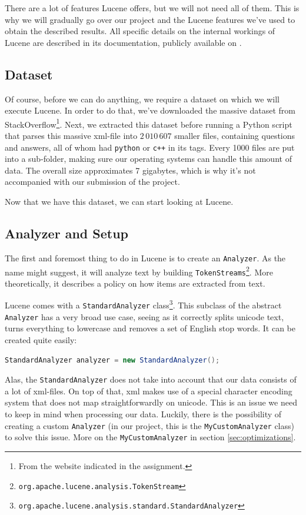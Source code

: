 \documentclass[11pt]{article}
\begin{document}
There are a lot of features Lucene offers, but we will not need all of them. This is why we will gradually go over our project and the Lucene features we've used to obtain the described results. All specific details on the internal workings of Lucene are described in its documentation, publicly available on \cite{lucene}.

\subsection{Dataset}
Of course, before we can do anything, we require a dataset on which we will execute Lucene. In order to do that, we've downloaded the massive dataset from StackOverflow\footnote{From the website indicated in the assignment.}. Next, we extracted this dataset before running a Python script that parses this massive xml-file into $2\,010\,607$ smaller files, containing questions and answers, all of whom had \texttt{python} or \texttt{c++} in its tags. Every 1000 files are put into a sub-folder, making sure our operating systems can handle this amount of data. The overall size approximates 7 gigabytes, which is why it's not accompanied with our submission of the project.

Now that we have this dataset, we can start looking at Lucene.

\subsection{Analyzer and Setup}\label{sec:analysetup}
The first and foremost thing to do in Lucene is to create an \texttt{Analyzer}. As the name might suggest, it will analyze text by building \texttt{TokenStreams}\footnote{\texttt{org.apache.lucene.analysis.TokenStream}}. More theoretically, it describes a policy on how items are extracted from text.

Lucene comes with a \texttt{StandardAnalyzer} class\footnote{\texttt{org.apache.lucene.analysis.standard.StandardAnalyzer}}. This subclass of the abstract \texttt{Analyzer} has a very broad use case, seeing as it correctly splits unicode text, turns everything to lowercase and removes a set of English stop words. It can be created quite easily:
\begin{lstlisting}[language=Java]
StandardAnalyzer analyzer = new StandardAnalyzer();
\end{lstlisting}

Alas, the \texttt{StandardAnalyzer} does not take into account that our data consists of a lot of xml-files. On top of that, xml makes use of a special character encoding system that does not map straightforwardly on unicode. This is an issue we need to keep in mind when processing our data. Luckily, there is the possibility of creating a custom \texttt{Analyzer} (in our project, this is the \texttt{MyCustomAnalyzer} class) to solve this issue. More on the \texttt{MyCustomAnalyzer} in section \ref{sec:optimizations}.
\end{document}

